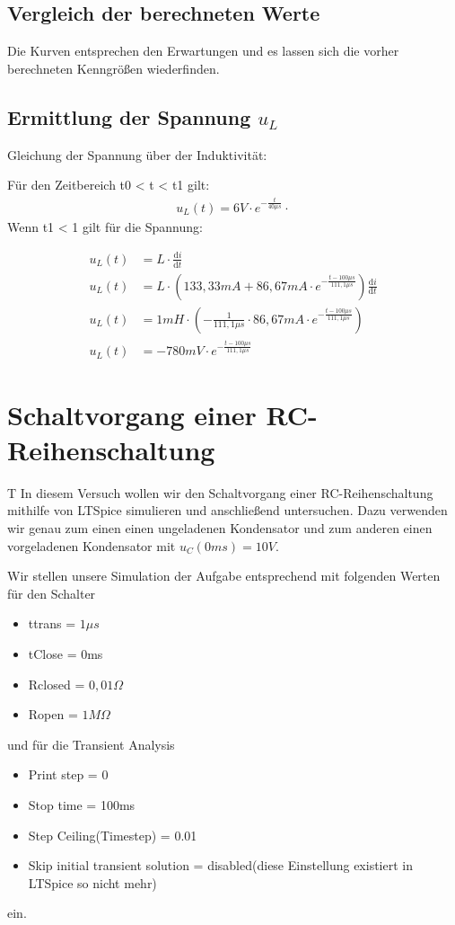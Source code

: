 \documentclass{article}
\begin{document}
\subsection{Vergleich der berechneten Werte}

Die Kurven entsprechen den Erwartungen und es lassen sich die vorher berechneten Kenngrößen wiederfinden.

\subsection{Ermittlung der Spannung $u_L$}

Gleichung der Spannung über der Induktivität:

Für den Zeitbereich t0 < t < t1 gilt:
\begin{align*}
  u_L(t) = 6V\cdot e^{-\frac{t}{40\mu s}}\cdot 
\end{align*}
Wenn t1 < 1 gilt für die Spannung:

\begin{align*}
  u_L(t) &= L\cdot \frac{\mathrm{d} i}{\mathrm{d} t}\\
  u_L(t) &= L\cdot (133,33mA + 86,67mA\cdot e^{-\frac{t-100\mu s}{111,1\mu s}})\frac{\mathrm{d} i}{\mathrm{d} t}\\
  u_L(t) &= 1mH\cdot \left(-\frac{1}{111,1\mu s}\cdot 86,67mA\cdot e^{-\frac{t-100\mu s}{111,1\mu s}}\right)\\
  u_L(t) &= -780mV\cdot e^{-\frac{t-100\mu s}{111,1\mu s}}
\end{align*}
\newpage

\section{Schaltvorgang einer RC-Reihenschaltung}

\begin{task}
  T
  In diesem Versuch wollen wir den Schaltvorgang einer RC-Reihenschaltung mithilfe von LTSpice simulieren und anschließend untersuchen. Dazu verwenden wir genau zum einen einen ungeladenen Kondensator und zum anderen einen vorgeladenen Kondensator mit $u_{C}(0ms) = 10V$.
\end{task}

Wir stellen unsere Simulation der Aufgabe entsprechend mit folgenden Werten für den Schalter
\begin{itemize}
  \item ttrans = $1\mu s$
  \item tClose = 0ms
  \item Rclosed = $0,01\Omega$
  \item Ropen = $1M\Omega$
\end{itemize}
und für die Transient Analysis
\begin{itemize}
  \item Print step = 0
  \item Stop time = 100ms
  \item Step Ceiling(Timestep) = 0.01
  \item Skip initial transient solution = disabled(diese Einstellung existiert in LTSpice so nicht mehr)
\end{itemize}
ein.
\end{document}
